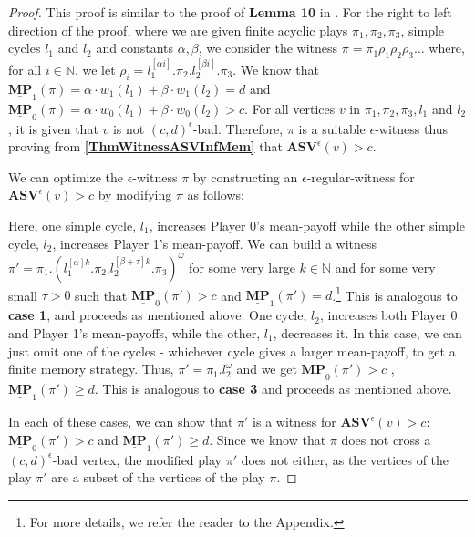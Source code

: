 \begin{proof}
This proof is similar to the proof of \textbf{Lemma 10} in \cite{FGR20}. 
For the right to left direction of the proof, where we are given finite acyclic plays $\pi_1, \pi_2, \pi_3$, simple cycles $l_1$ and $l_2$ and constants $\alpha, \beta$, we consider the witness $\pi = \pi_1\rho_1\rho_2\rho_3\dots$ where, for all $i \in \mathbb{N}$, we let $\rho_i = l_1^{[\alpha i]}.\pi_2.l_2^{[\beta i]}.\pi_3$. 
We know that $\underline{\mathbf{MP}}_1(\pi) = \alpha \cdot w_1(l_1) + \beta \cdot w_1(l_2) = d$ and $\underline{\mathbf{MP}}_0(\pi) = \alpha \cdot w_0(l_1) + \beta \cdot w_0(l_2) > c$. For all vertices $v$ in $\pi_1, \pi_2, \pi_3, l_1$ and $l_2$, it is given that $v$ is not $(c,d)^\epsilon$-bad. 
Therefore, $\pi$ is a suitable $\epsilon$-witness thus proving from \textbf{\cref{ThmWitnessASVInfMem}} that $\mathbf{ASV}^{\epsilon}(v) > c$.

We can optimize the $\epsilon$-witness $\pi$ by constructing an $\epsilon$-regular-witness for $\mathbf{ASV}^{\epsilon}(v) > c$ by modifying $\pi$ as follows:
\begin{caseof}
    Here, one simple cycle, $l_1$, increases Player 0's mean-payoff while the other simple cycle, $l_2$, increases Player 1's mean-payoff. We can build a witness $\pi' = \pi_1.(l_1^{[\alpha]k}.\pi_2.l_2^{[\beta+\tau]k}.\pi_3)^{\omega}$ for some very large $k \in \mathbb{N}$ and for some very small $\tau > 0$ such that $\underline{\mathbf{MP}}_0(\pi') > c$ and $\underline{\mathbf{MP}}_1(\pi') = d$.\footnote{For more details, we refer the reader to the Appendix.}
    This is analogous to \textbf{case 1}, and proceeds as mentioned above.
    One cycle, $l_2$, increases both Player 0 and Player 1's mean-payoffs, while the other, $l_1$, decreases it. In this case, we can just omit one of the cycles - whichever cycle gives a larger mean-payoff, to get a finite memory strategy. Thus, $\pi' = \pi_1.l_2^{\omega}$ and we get $\underline{\mathbf{MP}}_0(\pi') > c$ , $\underline{\mathbf{MP}}_1(\pi') \geqslant d$.
    This is analogous to \textbf{case 3} and proceeds as mentioned above.
\end{caseof}
In each of these cases, we can show that $\pi'$ is a witness for $\mathbf{ASV}^{\epsilon}(v) > c$: $\underline{\mathbf{MP}}_0(\pi') > c$ and $\underline{\mathbf{MP}}_1(\pi') \geqslant d$.
Since we know that $\pi$ does not cross a $(c,d)^{\epsilon}$-bad vertex, the modified play $\pi'$ does not either, as the vertices of the play $\pi'$ are a subset of the vertices of the play $\pi$. 


\end{proof}

